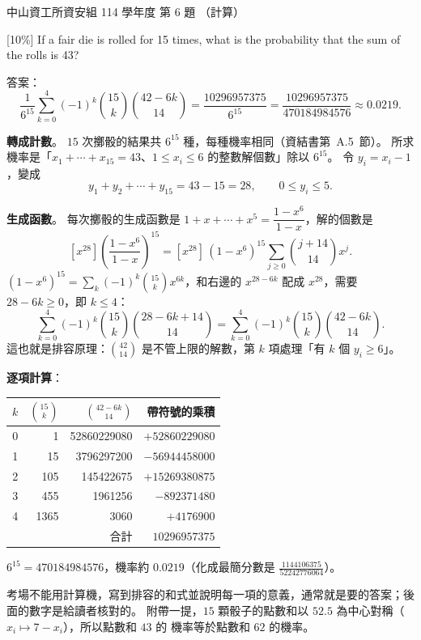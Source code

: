 \begin{pastexam}[label={px:nsysu-114-dmalg-05}]{中山資工所資安組 114 學年度 第 6 題}
（計算）

{[10\%]} If a fair die is rolled for 15 times, what is the probability that the sum of the rolls
is 43?
\end{pastexam}

\begin{pastsoln}
答案：
\[
\frac{1}{6^{15}} \sum_{k=0}^{4} (-1)^k \binom{15}{k} \binom{42 - 6k}{14}
= \frac{10296957375}{6^{15}} = \frac{10296957375}{470184984576} \approx 0.0219 .
\]

\textbf{轉成計數}。 $15$ 次擲骰的結果共 $6^{15}$ 種，每種機率相同（資結書第~A.5~節）。 所求
機率是「$x_1 + \cdots + x_{15} = 43$、$1 \le x_i \le 6$ 的整數解個數」除以 $6^{15}$。 令
$y_i = x_i - 1$，變成
\[
y_1 + y_2 + \cdots + y_{15} = 43 - 15 = 28, \qquad 0 \le y_i \le 5 .
\]

\textbf{生成函數}。 每次擲骰的生成函數是 $1 + x + \cdots + x^5 = \dfrac{1 - x^6}{1 - x}$，解的個數是
\[
[x^{28}] \left(\frac{1 - x^6}{1 - x}\right)^{15}
= [x^{28}]\, (1 - x^6)^{15} \sum_{j \ge 0} \binom{j + 14}{14} x^j .
\]
$(1 - x^6)^{15} = \sum_k (-1)^k \binom{15}{k} x^{6k}$，和右邊的 $x^{28 - 6k}$ 配成 $x^{28}$，需要
$28 - 6k \ge 0$，即 $k \le 4$：
\[
\sum_{k=0}^{4} (-1)^k \binom{15}{k} \binom{28 - 6k + 14}{14}
= \sum_{k=0}^{4} (-1)^k \binom{15}{k} \binom{42 - 6k}{14} .
\]
這也就是排容原理：$\binom{42}{14}$ 是不管上限的解數，第 $k$ 項處理「有 $k$ 個 $y_i \ge 6$」。

\textbf{逐項計算}：
\begin{center}
\begin{tabular}{crrr}
\toprule
$k$ & $\binom{15}{k}$ & $\binom{42 - 6k}{14}$ & 帶符號的乘積 \\
\midrule
0 & 1 & 52860229080 & $+52860229080$ \\
1 & 15 & 3796297200 & $-56944458000$ \\
2 & 105 & 145422675 & $+15269380875$ \\
3 & 455 & 1961256 & $-892371480$ \\
4 & 1365 & 3060 & $+4176900$ \\
\midrule
 & & 合計 & $10296957375$ \\
\bottomrule
\end{tabular}
\end{center}
$6^{15} = 470184984576$，機率約 $0.0219$（化成最簡分數是 $\frac{1144106375}{52242776064}$）。

考場不能用計算機，寫到排容的和式並說明每一項的意義，通常就是要的答案；後面的數字是給讀者核對的。
附帶一提，$15$ 顆骰子的點數和以 $52.5$ 為中心對稱（$x_i \mapsto 7 - x_i$），所以點數和 $43$ 的
機率等於點數和 $62$ 的機率。
\end{pastsoln}
